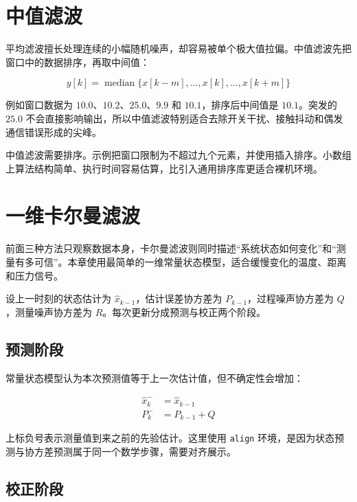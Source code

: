 \section{中值滤波}

平均滤波擅长处理连续的小幅随机噪声，却容易被单个极大值拉偏。中值滤波先把窗口中的数据排序，再取中间值：

\begin{equation}
y[k]=\operatorname{median}\{x[k-m],\ldots,x[k],\ldots,x[k+m]\}
\end{equation}

例如窗口数据为 $10.0$、$10.2$、$25.0$、$9.9$ 和 $10.1$，排序后中间值是 $10.1$。突发的 $25.0$ 不会直接影响输出，所以中值滤波特别适合去除开关干扰、接触抖动和偶发通信错误形成的尖峰。

中值滤波需要排序。示例把窗口限制为不超过九个元素，并使用插入排序。小数组上算法结构简单、执行时间容易估算，比引入通用排序库更适合裸机环境。

\section{一维卡尔曼滤波}

前面三种方法只观察数据本身，卡尔曼滤波则同时描述“系统状态如何变化”和“测量有多可信”。本章使用最简单的一维常量状态模型，适合缓慢变化的温度、距离和压力信号。

设上一时刻的状态估计为 $\hat{x}_{k-1}$，估计误差协方差为 $P_{k-1}$，过程噪声协方差为 $Q$，测量噪声协方差为 $R$。每次更新分成预测与校正两个阶段。

\subsection{预测阶段}

常量状态模型认为本次预测值等于上一次估计值，但不确定性会增加：

\begin{align}
\hat{x}_{k}^{-} &= \hat{x}_{k-1} \\
P_{k}^{-} &= P_{k-1}+Q
\label{eq:kalman-predict}
\end{align}

上标负号表示测量值到来之前的先验估计。这里使用 \texttt{align} 环境，是因为状态预测与协方差预测属于同一个数学步骤，需要对齐展示。

\subsection{校正阶段}

